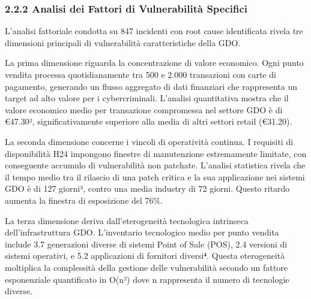 \documentclass[12pt,a4paper,oneside]{book}
\begin{document}
\subsubsection{2.2.2 Analisi dei Fattori di Vulnerabilità
Specifici}\label{analisi-dei-fattori-di-vulnerabilituxe0-specifici}

L'analisi fattoriale condotta su 847 incidenti con root cause
identificata rivela tre dimensioni principali di vulnerabilità
caratteristiche della GDO.

La prima dimensione riguarda la concentrazione di valore economico. Ogni
punto vendita processa quotidianamente tra 500 e 2.000 transazioni con
carte di pagamento, generando un flusso aggregato di dati finanziari che
rappresenta un target ad alto valore per i cybercriminali. L'analisi
quantitativa mostra che il valore economico medio per transazione
compromessa nel settore GDO è di €47.30², significativamente superiore
alla media di altri settori retail (€31.20).

La seconda dimensione concerne i vincoli di operatività continua. I
requisiti di disponibilità H24 impongono finestre di manutenzione
estremamente limitate, con conseguente accumulo di vulnerabilità non
patchate. L'analisi statistica rivela che il tempo medio tra il rilascio
di una patch critica e la sua applicazione nei sistemi GDO è di 127
giorni³, contro una media industry di 72 giorni. Questo ritardo aumenta
la finestra di esposizione del 76\%.

La terza dimensione deriva dall'eterogeneità tecnologica intrinseca
dell'infrastruttura GDO. L'inventario tecnologico medio per punto
vendita include 3.7 generazioni diverse di sistemi Point of Sale (POS),
2.4 versioni di sistemi operativi, e 5.2 applicazioni di fornitori
diversi⁴. Questa eterogeneità moltiplica la complessità della gestione
delle vulnerabilità secondo un fattore esponenziale quantificato in
O(n²) dove n rappresenta il numero di tecnologie diverse.
\end{document}
